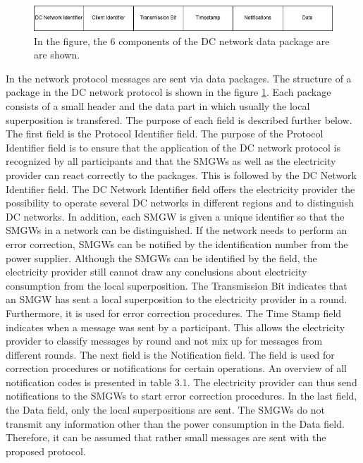 \\
\\\begin{figure}[tbp]
  \centering
  \includegraphics[width=1\textwidth]{images/Header.png}
  \caption[DC Network Frame]{
In the figure, the 6 components of the DC network data package are
are shown.}
  \label{fig:frame}
\end{figure}In the network protocol messages are sent via data packages. The structure of a package in the DC network protocol is shown in the figure \ref{fig:frame}. Each package consists of a small header and the data part in which usually the local superposition is transfered. The purpose of each field is described further below.\\
The first field is the Protocol Identifier field. The purpose of the Protocol Identifier field is to ensure that the application of the DC network protocol is recognized by all participants and that the \gls{SMGW}s as well as the electricity provider can react correctly to the packages. This is followed by the DC Network Identifier field.%
The DC Network Identifier field offers the electricity provider the possibility to operate several DC networks in different regions and to distinguish DC networks. In addition, each \gls{SMGW} is given a unique identifier so that the \gls{SMGW}s in a network can be distinguished. If the network needs to perform an error correction, \gls{SMGW}s can be notified by the identification number from the power supplier. Although the \gls{SMGW}s can be identified by the field, the electricity provider still cannot draw any conclusions about electricity consumption from the local superposition. The Transmission Bit indicates that an \gls{SMGW} has sent a local superposition to the electricity provider in a round. Furthermore, it is used for error correction procedures. The Time Stamp field indicates when a message was sent by a participant. This allows the electricity provider to classify messages by round and not mix up for messages from different rounds. The next field is the Notification field. The field is used for correction procedures or notifications for certain operations. An overview of all notification codes is presented in table 3.1. The electricity provider can thus send notifications to the \gls{SMGW}s to start error correction procedures. In the last field, the Data field, only the local superpositions are sent. The \gls{SMGW}s do not transmit any information other than the power consumption in the Data field. Therefore, it can be assumed that rather small messages are sent with the proposed protocol.\\
